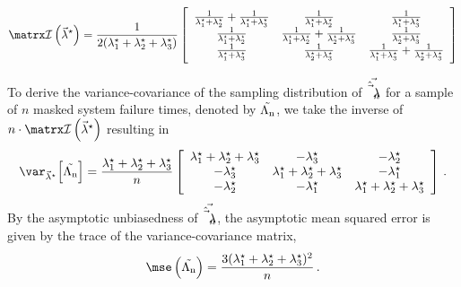 \documentclass[../main.tex]{subfiles}
\begin{document}
\begin{equation}
\infomatrx \left ( \tparam{\vec\lambda} \right ) =
\frac{1}{2(\tparam{\lambda}_1 + \tparam{\lambda}_2 + \tparam{\lambda}_3)}
\left[
\begin{array}{ccc}
 \frac{1}{\tparam{\lambda}_1+\tparam{\lambda}_2}+\frac{1}{\tparam{\lambda}_1+\tparam{\lambda}_3}    & \frac{1}{\tparam{\lambda}_1+\tparam{\lambda}_2}                                                   & \frac{1}{\tparam{\lambda}_1+\tparam{\lambda}_3}\\
 \frac{1}{\tparam{\lambda}_1+\tparam\lambda _2}                                                            & \frac{1}{\tparam{\lambda}_1+\tparam{\lambda}_2}+\frac{1}{\tparam{\lambda}_2+\tparam{\lambda}_3}   & \frac{1}{\tparam{\lambda}_2+\tparam{\lambda}_3}\\
 \frac{1}{\tparam{\lambda}_1+\tparam{\lambda}_3}                                                    & \frac{1}{\tparam{\lambda}_2+\tparam{\lambda}_3}                                                   & \frac{1}{\tparam{\lambda}_1+\tparam{\lambda}_3}+\frac{1}{\tparam{\lambda}_2+\tparam{\lambda}_3}
\end{array}
\right]
\end{equation}

To derive the variance-covariance of the sampling distribution of $\vec{\hat{\vec\lambda}_n}$ for a sample of $n$ masked system failure times, denoted by $\mathrm{\vec{\Lambda_n}}$, we take the inverse of $n \cdot \infomatrx \left(\tparam{\vec\lambda} \right)$ resulting in
\begin{equation}
    \var_{\tparam{\vec\lambda}}\!\left[\sampdexpo\right] = \frac{\tparam{\lambda}_1+\tparam{\lambda}_2+\tparam{\lambda}_3}{n}
    \left[
        \begin{array}{ccc}
         \tparam{\lambda}_1 +  \tparam{\lambda}_2 +  \tparam{\lambda}_3 & - \tparam{\lambda}_3 & - \tparam{\lambda}_2 \\
        -\tparam{\lambda}_3 &  \tparam{\lambda}_1 +  \tparam{\lambda}_2   + \tparam{\lambda}_3 & - \tparam{\lambda}_1 \\
        -\tparam{\lambda}_2 & -\tparam{\lambda}_1  & \tparam{\lambda}_1   + \tparam{\lambda}_2   + \tparam{\lambda}_3 \\
\end{array}
\right]\,.
\end{equation}
By the asymptotic unbiasedness of $\vec{\hat{\vec\lambda}_n}$, the asymptotic mean squared error is given by the trace of the variance-covariance matrix,
\begin{equation}
    \mse\left(\sampdexpo\right) = \frac{3(\tparam{\lambda}_1 +  \tparam{\lambda}_2 +  \tparam{\lambda}_3)^2}{n}\,.
\end{equation}
\end{document}
